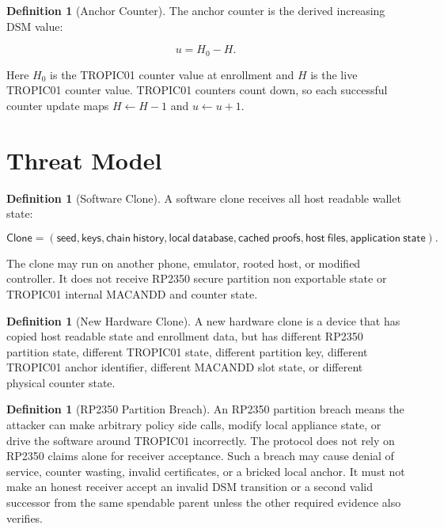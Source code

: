 \documentclass[11pt]{article}
\theoremstyle{definition}
\newtheorem{definition}[theorem]{Definition}
\theoremstyle{remark}
\begin{document}
\begin{definition}[Anchor Counter]
The anchor counter is the derived increasing DSM value:

\[
u = H_0-H.
\]

Here \(H_0\) is the TROPIC01 counter value at enrollment and \(H\) is the live TROPIC01 counter
value. TROPIC01 counters count down, so each successful counter update maps \(H\leftarrow H-1\)
and \(u\leftarrow u+1\).
\end{definition}

\section{Threat Model}

\begin{definition}[Software Clone]
A software clone receives all host readable wallet state:

\[
\mathsf{Clone}
=
(
\mathsf{seed},
\mathsf{keys},
\mathsf{chain\ history},
\mathsf{local\ database},
\mathsf{cached\ proofs},
\mathsf{host\ files},
\mathsf{application\ state}
).
\]

The clone may run on another phone, emulator, rooted host, or modified controller. It does not
receive RP2350 secure partition non exportable state or TROPIC01 internal MACANDD and counter
state.
\end{definition}

\begin{definition}[New Hardware Clone]
A new hardware clone is a device that has copied host readable state and enrollment data, but has
different RP2350 partition state, different TROPIC01 state, different partition key, different
TROPIC01 anchor identifier, different MACANDD slot state, or different physical counter state.
\end{definition}

\begin{definition}[RP2350 Partition Breach]
An RP2350 partition breach means the attacker can make arbitrary policy side calls, modify local
appliance state, or drive the software around TROPIC01 incorrectly. The protocol does not rely on
RP2350 claims alone for receiver acceptance. Such a breach may cause denial of service, counter
wasting, invalid certificates, or a bricked local anchor. It must not make an honest receiver accept
an invalid DSM transition or a second valid successor from the same spendable parent unless the
other required evidence also verifies.
\end{definition}
\end{document}
